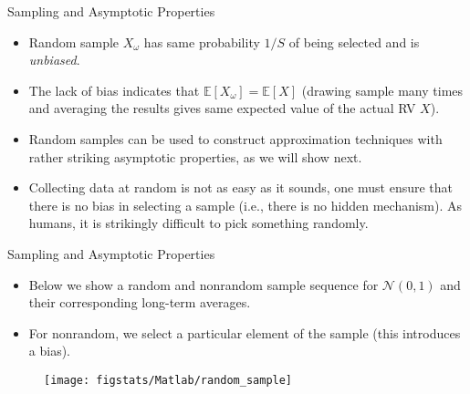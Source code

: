 \documentclass[9pt]{beamer}
\begin{document}
%
\begin{frame}{Sampling and Asymptotic Properties}

\begin{itemize}

\item Random sample $X_\omega$ has same probability $1/S$ of being selected and is {\em unbiased}. 

\item The lack of bias indicates that $\mathbb{E}[X_\omega]=\mathbb{E}[X]$ (drawing sample many times and averaging the results gives same expected value of the actual RV $X$). 

\item Random samples can be used to construct approximation techniques with rather striking asymptotic properties, as we will show next.  

\item Collecting data at random is not as easy as it sounds, one must ensure that there is no bias in selecting a sample (i.e., there is no hidden mechanism).  As humans, it is strikingly difficult to pick something randomly. 

\end{itemize}

\end{frame}

%
\begin{frame}{Sampling and Asymptotic Properties}
\begin{itemize}
\item Below we show a random and nonrandom sample sequence for $\mathcal{N}(0,1)$ and their corresponding long-term  averages. 
\item For nonrandom, we select a particular element of the sample (this introduces a bias). 
\end{itemize}
\begin{figure}[!htb]
    \centering
	\texttt{[image: figstats/Matlab/random\_sample]}
\end{figure}

\end{frame}
\end{document}
